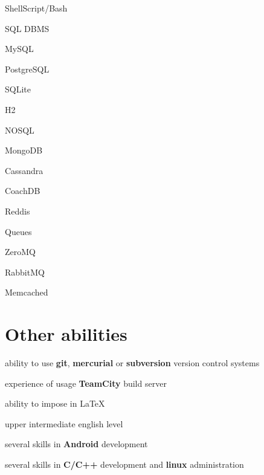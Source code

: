 \documentclass[10pt, a4paper, english]{article}
\begin{document}
\begin{multicols}{3}
\begin {list}{\textbullet}{}
\begin {list}{\textbullet}{}
\end{list}
\item ShellScript/Bash
\columnbreak
\item SQL DBMS
\begin {list}{\textbullet}{}
\item MySQL
\item PostgreSQL
\item SQLite
\item H2
\end{list}
\item NOSQL
\begin {list}{\textbullet}{}
\item MongoDB
\item Cassandra
\item CoachDB
\item Reddis
\end{list}
\item Queues
\begin {list}{\textbullet}{}
\item ZeroMQ
\item RabbitMQ
\end{list}
\item Memcached
\end{list}
\end{multicols}


\section* {Other abilities}
\begin {list}{\textbullet}{}
\item ability to use \textbf{git}, \textbf{mercurial} or \textbf{subversion} version control systems
\item experience of usage \textbf{TeamCity} build server
\item ability to impose in \LaTeX
\item upper intermediate english level
\item several skills in \textbf{Android} development
\item several skills in \textbf{C/C++} development and \textbf{linux} administration
\end {list}
\end{document}
